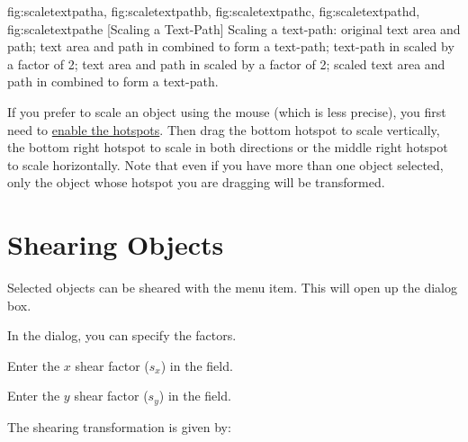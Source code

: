 {
 {fig:scaletextpatha}{}{},
 {fig:scaletextpathb}{}{},
 {fig:scaletextpathc}{}{},
 {fig:scaletextpathd}{}{},
 {fig:scaletextpathe}{}{}
}
[Scaling a Text-Path]
{Scaling a text-path:
 original text area and path;
 text area and path in
 combined to form a text-path;
 text-path 
in  scaled by a factor of 2;
 text area and path 
in  scaled by a factor of 2;
 scaled text area and path 
in  combined to form a text-path.}

If you prefer to scale an \gls{object} using the mouse (which is
less precise), you first need to \hyperref[mi:hotspots]{enable the
hotspots}. Then drag the bottom  hotspot to scale
vertically, the bottom right hotspot to scale in both directions or
the middle right hotspot to scale horizontally. Note that even if
you have more than one object selected, only the object whose
hotspot you are dragging will be transformed.




\section{Shearing Objects}\label{sec:shearobjects}


Selected \glspl{object} can be sheared with
the  menu item. This will open up the
 dialog box.


In the  dialog, you can specify the
 factors.

Enter the $x$ shear factor ($s_x$) in the  field.

Enter the $y$ shear factor ($s_y$) in the  field.

The shearing transformation is given by:
\TeXParserLibToImage
[div=displaymath,alt={
 (
   [ 1 , sX ]
   [ sY , 1 ]
 )
 (
   [ x ]
   [ y ]
 )
=
 (
   [ x + sX \texttimes\ y ]
   [ y + sY \texttimes\ x ]
 )
}]
{
\[
  \left(
  \begin{array}{cc}
  1 & s_x\\
  s_y & 1
  \end{array}
  \right)
  \left(
  \begin{array}{c}
  x\\
  y
  \end{array}
  \right)
  =
  \left(
  \begin{array}{l}
  x + s_x y\\
  y + s_y x
  \end{array}
  \right)
  \]
}

